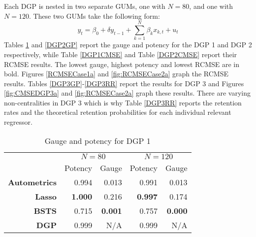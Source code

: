 Each DGP is nested in two separate GUMs, one with $N=80$, and one with $N=120$. These two GUMs take the following form:
$$y_{t}=\beta_{0} + \delta y_{t-1}+\sum_{k=1}^{N}\beta_{k}x_{k,t} + u_{t}$$
Tables \ref{DGP1GP} and \ref{DGP2GP} report the gauge and potency for the DGP 1 and DGP 2 respectively, while Table \ref{DGP1CMSE} and Table \ref{DGP2CMSE} report their RCMSE results. The lowest gauge, highest potency and lowest RCMSE are in bold. Figures \ref{RCMSECase1a} and \ref{fig:RCMSECase2a} graph the RCMSE results. Tables \ref{DGP3GP}-\ref{DGP3RR} report the results for DGP 3 and Figures \ref{fig:CMSEDGP3a} and \ref{fig:RCMSECase2a} graph these results. There are varying non-centralities in DGP 3 which is why Table \ref{DGP3RR} reports the retention rates and the theoretical retention probabilities for each individual relevant regressor.  
\\
\begin{table}[htbp]
  \centering
 
    \begin{tabular}{r|r|r|r|r}

         & \multicolumn{2}{|c|}{\textbf{$N=80$}} & \multicolumn{2}{|c}{\textbf{$N=120$}} \\
            & Potency           & Gauge           & Potency            & Gauge           \\
          \hline
    \textbf{Autometrics} & 0.994 & 0.013 & 0.991 & 0.013 \\
    \textbf{Lasso} & \textbf{1.000} & 0.216 & \textbf{0.997} & 0.174 \\
    \textbf{BSTS} & 0.715 & \textbf{0.001} & 0.757 & \textbf{0.000} \\
    \hline
    \textbf{DGP} & 0.999 & N/A   & 0.999 & N/A \\

    \end{tabular}%
 
  \caption{Gauge and potency for DGP 1} 
   \label{DGP1GP}%
\end{table}%


